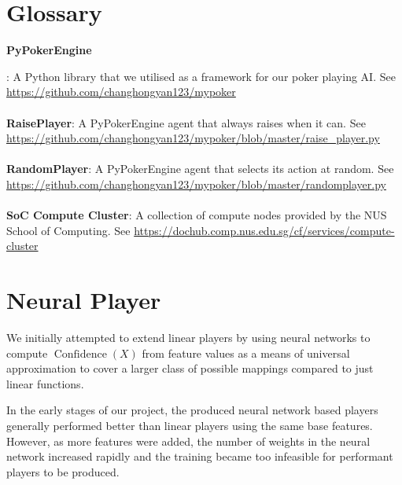 \documentclass{article}
\begin{document}
\begin{appendices}

\section{Glossary}
\hypertarget{pypokerengine}{\textbf{PyPokerEngine}}: A Python library that we utilised as a framework for our poker playing AI. See \url{https://github.com/changhongyan123/mypoker}
\\\\\hypertarget{raiseplayer}{\textbf{RaisePlayer}}: A PyPokerEngine agent that always raises when it can. See \url{https://github.com/changhongyan123/mypoker/blob/master/raise_player.py}
\\\\\hypertarget{randomplayer}{\textbf{RandomPlayer}}: A PyPokerEngine agent that selects its action at random. See \url{https://github.com/changhongyan123/mypoker/blob/master/randomplayer.py}
\\\\\hypertarget{computecluster}{\textbf{SoC Compute Cluster}}: A collection of compute nodes provided by the NUS School of Computing. See \url{https://dochub.comp.nus.edu.sg/cf/services/compute-cluster}

\section{Neural Player}
We initially attempted to extend linear players by using neural networks to compute \(\operatorname{Confidence}(X)\) from feature values as a means of universal approximation to cover a larger class of possible mappings compared to just linear functions.

In the early stages of our project, the produced neural network based players generally performed better than linear players using the same base features. However, as more features were added, the number of weights in the neural network increased rapidly and the training became too infeasible for performant players to be produced.

\end{appendices}



\end{document}
